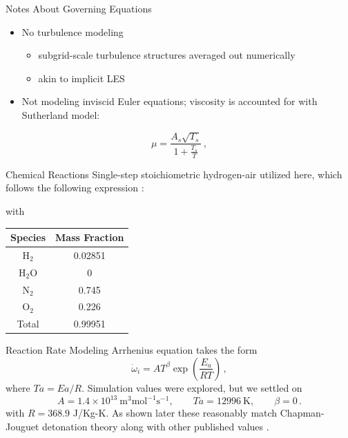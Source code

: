 \begin{frame}{Notes About Governing Equations}
\begin{itemize}
\item No turbulence modeling 
\begin{itemize}
    \item subgrid-scale turbulence structures averaged out numerically
    \item akin to implicit LES
\end{itemize}
\item Not modeling inviscid Euler equations; viscosity is accounted for with Sutherland \cite{sutherland} model:
\end{itemize}
\begin{equation}
\mu = \frac{A_s \sqrt{T_s}}{1 + \frac{T_s}{T}} \,,
\end{equation}
\end{frame}

\begin{frame}{Chemical Reactions}
Single-step stoichiometric hydrogen-air utilized here, which follows the following expression \cite{kuo}:
\begin{center}
\end{center}
with
\begin{table}[t!]
\centering
\begin{tabular}{cc}
Species & Mass Fraction \\ \hline
H\(_2\) & 0.02851 \\ 
H\(_2\)O & 0 \\
N\(_2\) & 0.745 \\ 
O\(_2\) & 0.226 \\ \hline
Total & 0.99951 \\ 
\end{tabular}
\end{table}
\end{frame}

\begin{frame}{Reaction Rate Modeling}
Arrhenius equation \cite{arrhenius} takes the form \cite{christ} 
\begin{equation}
\dot{\omega}_i = AT^\beta \exp\left(\frac{E_a}{R T}\right)\,,
\end{equation}
where $Ta = Ea/R$. Simulation values were explored, but we settled on 
\begin{equation}
   A = 1.4 \times 10^{13} ~ \text{m}^3\text{mol}^{-1}\text{s}^{-1},
   \qquad 
   Ta = 12996 ~\text{K},
   \qquad
   \beta = 0\,.
\end{equation}
with \(R = 368.9\) J/Kg-K. As shown later these reasonably match Chapman-Jouguet detonation theory \cite{chapman} along with other published values \cite{towery1,hashemi}.
\end{frame}


